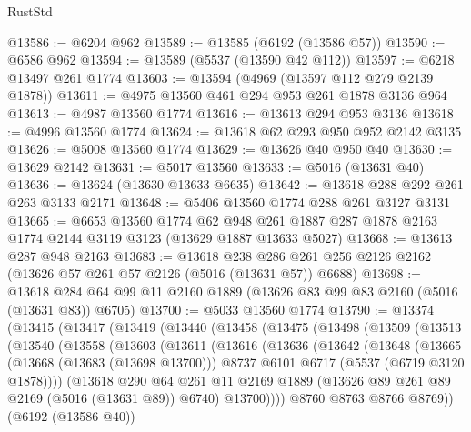 \begin{lexlean}{RustStd}
\begin{coremodule}
@13586 := @6204 @962
@13589 := @13585 (@6192 (@13586 @57))
@13590 := @6586 @962
@13594 := @13589 (@5537 (@13590 @42 @112))
@13597 := @6218 @13497 @261 @1774
@13603 := @13594 (@4969 (@13597 @112 @279 @2139 @1878))
@13611 := @4975 @13560 @461 @294 @953 @261 @1878 @3136 @964
@13613 := @4987 @13560 @1774
@13616 := @13613 @294 @953 @3136
@13618 := @4996 @13560 @1774
@13624 := @13618 @62 @293 @950 @952 @2142 @3135
@13626 := @5008 @13560 @1774
@13629 := @13626 @40 @950 @40
@13630 := @13629 @2142
@13631 := @5017 @13560
@13633 := @5016 (@13631 @40)
@13636 := @13624 (@13630 @13633 @6635)
@13642 := @13618 @288 @292 @261 @263 @3133 @2171
@13648 := @5406 @13560 @1774 @288 @261 @3127 @3131
@13665 := @6653
    @13560
    @1774
    @62
    @948
    @261
    @1887
    @287
    @1878
    @2163
    @1774
    @2144
    @3119
    @3123
    (@13629 @1887 @13633 @5027)
@13668 := @13613 @287 @948 @2163
@13683 := @13618
    @238
    @286
    @261
    @256
    @2126
    @2162
    (@13626 @57 @261 @57 @2126 (@5016 (@13631 @57)) @6688)
@13698 := @13618 @284 @64 @99 @11 @2160 @1889 (@13626 @83 @99 @83 @2160 (@5016 (@13631 @83)) @6705)
@13700 := @5033 @13560 @1774
@13790 := @13374
    (@13415
      (@13417
        (@13419
          (@13440
            (@13458
              (@13475
                (@13498
                  (@13509
                    (@13513
                      (@13540
                        (@13558
                          (@13603
                            (@13611
                              (@13616
                                (@13636
                                  (@13642
                                    (@13648
                                      (@13665
                                        (@13668 (@13683 (@13698 @13700)))
                                        @8737
                                        @6101
                                        @6717
                                        (@5537 (@6719 @3120 @1878))))
                                    (@13618
                                      @290
                                      @64
                                      @261
                                      @11
                                      @2169
                                      @1889
                                      (@13626 @89 @261 @89 @2169 (@5016 (@13631 @89)) @6740)
                                      @13700))))
                              @8760
                              @8763
                              @8766
                              @8769))
                          (@6192 (@13586 @40))

\end{coremodule}
\end{lexlean}
